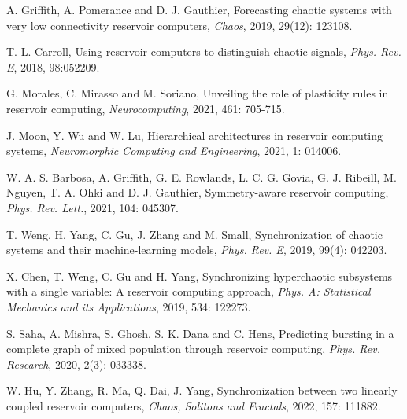 \documentclass[notitlepage,cs4size,punct,oneside]{ctexrep}
\numberwithin{equation}{chapter}
\theoremstyle{mystyle}
\begin{document}
\begin{thebibliography}{99}
 A. Griffith, A. Pomerance and D. J. Gauthier,
Forecasting chaotic systems with very low connectivity reservoir computers,
\emph{Chaos}, 2019, 29(12): 123108.

 T. L. Carroll,
Using reservoir computers to distinguish chaotic signals, 
\emph{Phys. Rev. E}, 2018, 98:052209.

 G. Morales, C. Mirasso and M. Soriano,
Unveiling the role of plasticity rules in reservoir computing,
\emph{Neurocomputing}, 2021, 461: 705-715.

 J. Moon, Y. Wu and W. Lu,
Hierarchical architectures in reservoir computing systems,
\emph{Neuromorphic Computing and Engineering}, 2021, 1: 014006.

 W. A. S. Barbosa, A. Griffith, G. E. Rowlands, L. C. G. Govia, G. J. Ribeill, M. Nguyen, T. A. Ohki and D. J. Gauthier,
Symmetry-aware reservoir computing,
\emph{Phys. Rev. Lett.}, 2021, 104: 045307.

 T. Weng, H. Yang, C. Gu, J. Zhang and M. Small,
Synchronization of chaotic systems and their machine-learning models,
\emph{Phys. Rev. E}, 2019, 99(4): 042203.

 X. Chen, T. Weng, C. Gu and H. Yang,
Synchronizing hyperchaotic subsystems with a single variable: A reservoir computing approach,
\emph{Phys. A: Statistical Mechanics and its Applications}, 2019, 534: 122273.

 S. Saha, A. Mishra, S. Ghosh, S. K. Dana and C. Hens,
Predicting bursting in a complete graph of mixed population through reservoir computing, 
\emph{Phys. Rev. Research}, 2020, 2(3): 033338.

 W. Hu, Y. Zhang, R. Ma, Q. Dai, J. Yang,
Synchronization between two linearly coupled reservoir computers, 
\emph{Chaos, Solitons and Fractals}, 2022, 157: 111882.

\end{thebibliography}



\chapter*{}




\end{document}
